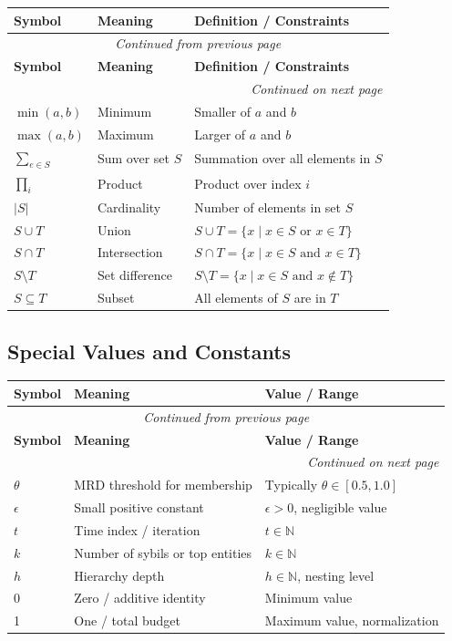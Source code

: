 \documentclass[11pt,a4paper]{article}
\theoremstyle{definition}
\theoremstyle{remark}
\begin{document}
\begin{longtable}{lll}
\toprule
\textbf{Symbol} & \textbf{Meaning} & \textbf{Definition / Constraints} \\
\midrule
\endfirsthead
\multicolumn{3}{c}{\textit{Continued from previous page}} \\
\toprule
\textbf{Symbol} & \textbf{Meaning} & \textbf{Definition / Constraints} \\
\midrule
\endhead
\midrule
\multicolumn{3}{r}{\textit{Continued on next page}} \\
\endfoot
\bottomrule
\endlastfoot
$\min(a,b)$ & Minimum & Smaller of $a$ and $b$ \\
$\max(a,b)$ & Maximum & Larger of $a$ and $b$ \\
$\sum_{e \in S}$ & Sum over set $S$ & Summation over all elements in $S$ \\
$\prod_{i}$ & Product & Product over index $i$ \\
$|S|$ & Cardinality & Number of elements in set $S$ \\
$S \cup T$ & Union & $S \cup T = \{x \mid x \in S \text{ or } x \in T\}$ \\
$S \cap T$ & Intersection & $S \cap T = \{x \mid x \in S \text{ and } x \in T\}$ \\
$S \setminus T$ & Set difference & $S \setminus T = \{x \mid x \in S \text{ and } x \notin T\}$ \\
$S \subseteq T$ & Subset & All elements of $S$ are in $T$ \\
\end{longtable}

\subsection{Special Values and Constants}

\begin{longtable}{lll}
\toprule
\textbf{Symbol} & \textbf{Meaning} & \textbf{Value / Range} \\
\midrule
\endfirsthead
\multicolumn{3}{c}{\textit{Continued from previous page}} \\
\toprule
\textbf{Symbol} & \textbf{Meaning} & \textbf{Value / Range} \\
\midrule
\endhead
\midrule
\multicolumn{3}{r}{\textit{Continued on next page}} \\
\endfoot
\bottomrule
\endlastfoot
$\theta$ & MRD threshold for membership & Typically $\theta \in [0.5, 1.0]$ \\
$\epsilon$ & Small positive constant & $\epsilon > 0$, negligible value \\
$t$ & Time index / iteration & $t \in \mathbb{N}$ \\
$k$ & Number of sybils or top entities & $k \in \mathbb{N}$ \\
$h$ & Hierarchy depth & $h \in \mathbb{N}$, nesting level \\
0 & Zero / additive identity & Minimum value \\
1 & One / total budget & Maximum value, normalization \\
\end{longtable}
\end{document}
